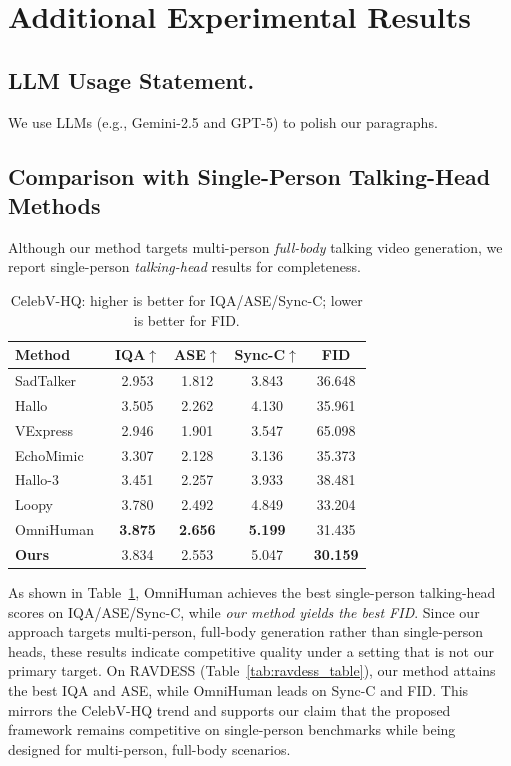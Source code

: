 \documentclass{article} %
\begin{document}
\section{Additional Experimental Results}

\subsection{LLM Usage Statement.} We use LLMs (e.g., Gemini-2.5 and GPT-5) to polish our paragraphs.

\subsection{Comparison with Single-Person Talking-Head Methods}
\label{app:talkinghead}
Although our method targets multi-person \emph{full-body} talking video generation, we report single-person \emph{talking-head} results for completeness.

\begin{table}[h]
\centering
\caption{CelebV-HQ: higher is better for IQA/ASE/Sync-C; lower is better for FID.}
\label{tab:celebv_table}
\begin{tabular}{lcccc}
\toprule
Method & IQA$\uparrow$ & ASE$\uparrow$ & Sync-C$\uparrow$ & FID \\
\midrule
SadTalker~\citep{zhang2023sadtalker} & 2.953 & 1.812 & 3.843 & 36.648 \\
Hallo~\citep{xu2024hallo} & 3.505 & 2.262 & 4.130 & 35.961 \\
VExpress~\citep{wang2024vexpress} & 2.946 & 1.901 & 3.547 & 65.098 \\
EchoMimic~\citep{chen2024echomimic} & 3.307 & 2.128 & 3.136 & 35.373 \\
Hallo-3~\citep{hallo3} & 3.451 & 2.257 & 3.933 & 38.481 \\
Loopy~\citep{jiang2024loopy} & 3.780 & 2.492 & 4.849 & 33.204 \\
OmniHuman~\citep{lin2025omnihuman} & \textbf{3.875} & \textbf{2.656} & \textbf{5.199} & 31.435 \\ \midrule
\textbf{Ours} & 3.834 & 2.553 & 5.047 & \textbf{30.159} \\
\bottomrule
\end{tabular}
\end{table}

As shown in Table~\ref{tab:celebv_table}, OmniHuman achieves the best single-person talking-head scores on IQA/ASE/Sync-C, while {\em our method yields the best FID}. Since our approach targets multi-person, full-body generation rather than single-person heads, these results indicate competitive quality under a setting that is not our primary target. On RAVDESS (Table~\ref{tab:ravdess_table}), our method attains the best IQA and ASE, while OmniHuman leads on Sync-C and FID. This mirrors the CelebV-HQ trend and supports our claim that the proposed framework remains competitive on single-person benchmarks while being designed for multi-person, full-body scenarios.
\end{document}
